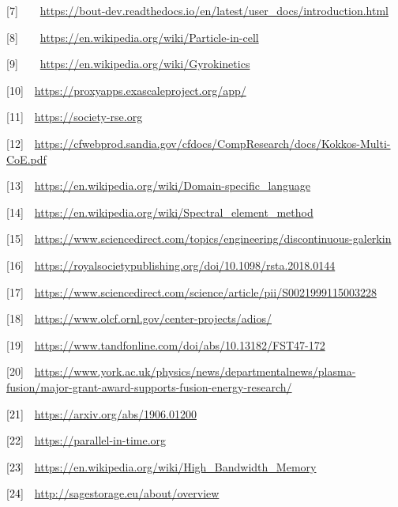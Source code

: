 \documentclass[a4paper]{article}
\begin{document}
[7]\ \ \ \ \url{https://bout-dev.readthedocs.io/en/latest/user_docs/introduction.html}

[8]\ \ \ \ \url{https://en.wikipedia.org/wiki/Particle-in-cell}

[9]\ \ \ \ \url{https://en.wikipedia.org/wiki/Gyrokinetics}

[10]\ \ \url{https://proxyapps.exascaleproject.org/app/}

[11]\ \ \url{https://society-rse.org}

[12]\ \ \url{https://cfwebprod.sandia.gov/cfdocs/CompResearch/docs/Kokkos-Multi-CoE.pdf}

[13]\ \ \url{https://en.wikipedia.org/wiki/Domain-specific_language}

[14]\ \ \url{https://en.wikipedia.org/wiki/Spectral_element_method}

[15]\ \ \url{https://www.sciencedirect.com/topics/engineering/discontinuous-galerkin}

[16]\ \ \url{https://royalsocietypublishing.org/doi/10.1098/rsta.2018.0144}

[17]\ \ \url{https://www.sciencedirect.com/science/article/pii/S0021999115003228}

[18]\ \ \url{https://www.olcf.ornl.gov/center-projects/adios/}

[19]\ \ \url{https://www.tandfonline.com/doi/abs/10.13182/FST47-172}

[20]\ \ \url{https://www.york.ac.uk/physics/news/departmentalnews/plasma-fusion/major-grant-award-supports-fusion-energy-research/}

\textcolor{black}{[21]\ \ }\url{https://arxiv.org/abs/1906.01200}

\textcolor{black}{[22]\ \ }\url{https://parallel-in-time.org}

\textcolor{black}{[23]\ \ }\url{https://en.wikipedia.org/wiki/High_Bandwidth_Memory}

\textcolor{black}{[24]\ \ }\url{http://sagestorage.eu/about/overview}


\bigskip


\bigskip
\end{document}
